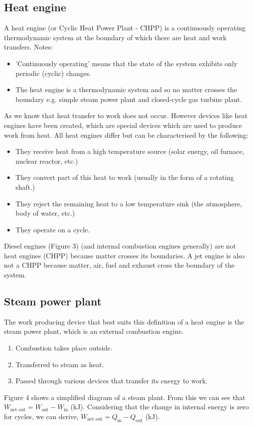\documentclass[class=report, crop=false, 12pt,a4paper]{standalone}
\begin{document}
\subsection{Heat engine}
A heat engine (or Cyclic Heat Power Plant - CHPP) is a continuously operating thermodynamic system at the boundary of which there are heat and work transfers.
Notes:
\begin{itemize}[noitemsep]
  \item 'Continuously operating' means that the state of the system exhibits only periodic (cyclic) changes.
  \item The heat engine is a thermodynamic system and so no matter crosses the boundary e.g. simple steam power plant and closed-cycle gas turbine plant.
\end{itemize}
As we know that heat transfer to work does not occur. However devices like heat engines have been created, which are special devices which are used to produce work from heat. All heat engines differ but can be characterised by the following: 
\begin{itemize}[noitemsep]
  \item They receive heat from a high temperature source (solar energy, oil furnace, nuclear reactor, etc.)
  \item They convert part of this heat to work (usually in the form of a rotating shaft.)
  \item They reject the remaining heat to a low temperature sink (the atmosphere, body of water, etc.)
  \item They operate on a cycle.
\end{itemize}
Diesel engines (Figure 3) (and internal combustion engines generally) are not heat engines (CHPP) because matter crosses its boundaries. A jet engine is also not a CHPP because matter, air, fuel and exhaust cross the boundary of the system.
\subsection{Steam power plant}
The work producing device that best suits this definition of a heat engine is the steam power plant, which is an external combustion engine.
\begin{enumerate}[noitemsep]
  \item Combustion takes place outside.
  \item Transferred to steam as heat.
  \item Passed through various devices that transfer its energy to work.
\end{enumerate}
Figure 4 shows a simplified diagram of a steam plant. From this we can see that \(W_{\textrm{net out}} = W_{\textrm{out}} - W_{\textrm{in}}\) (\si{\kilo\joule}). Considering that the change in internal energy is zero for cycles, we can derive, \(W_{\textrm{net out}} = Q_{\textrm{in}} - Q_{\textrm{out}}\) (\si{\kilo\joule}).
\end{document}
